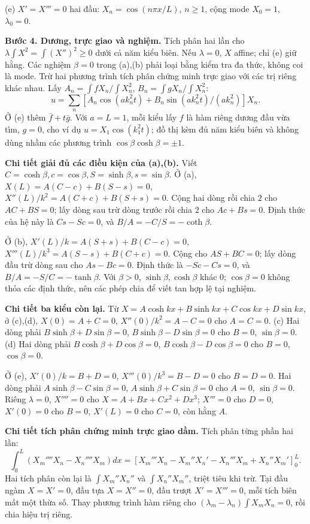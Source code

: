 \documentclass[10pt,a4paper]{article}
\begin{document}
(e) $X'=X'''=0$ hai đầu: $X_n=\cos(n\pi x/L)$, $n\ge1$, cộng mode $X_0=1$, $\lambda_0=0$.

\textbf{Bước 4. Dương, trực giao và nghiệm.} Tích phân hai lần cho $\lambda\int X^2=\int(X'')^2\ge0$ dưới cả năm kiểu biên. Nếu $\lambda=0$, $X$ affine; chỉ (e) giữ hằng. Các nghiệm $\beta=0$ trong (a),(b) phải loại bằng kiểm tra đa thức, không coi là mode. Trừ hai phương trình tích phân chứng minh trực giao với các trị riêng khác nhau. Lấy $A_n=\int fX_n/\int X_n^2$, $B_n=\int gX_n/\int X_n^2$:
\[u=\sum_n[A_n\cos(ak_n^2t)+B_n\sin(ak_n^2t)/(ak_n^2)]X_n.\]
Ở (e) thêm $\bar f+t\bar g$. Với $a=L=1$, mỗi kiểu lấy $f$ là hàm riêng dương đầu vừa tìm, $g=0$, cho ví dụ $u=X_1\cos(k_1^2t)$; đồ thị kèm đủ năm kiểu biên và không dùng nhầm các phương trình $\cos\beta\cosh\beta=\pm1$.

\textbf{Chi tiết giải đủ các điều kiện của (a),(b).} Viết $C=\cosh\beta,c=\cos\beta,S=\sinh\beta,s=\sin\beta$.
Ở (a), $X(L)=A(C-c)+B(S-s)=0$, $X''(L)/k^2=A(C+c)+B(S+s)=0$. Cộng hai dòng rồi chia $2$ cho $AC+BS=0$; lấy dòng sau trừ dòng trước rồi chia $2$ cho $Ac+Bs=0$. Định thức của hệ này là $Cs-Sc=0$, và $B/A=-C/S=-\coth\beta$.

Ở (b), $X'(L)/k=A(S+s)+B(C-c)=0$, $X'''(L)/k^3=A(S-s)+B(C+c)=0$. Cộng cho $AS+BC=0$; lấy dòng đầu trừ dòng sau cho $As-Bc=0$. Định thức là $-Sc-Cs=0$, và $B/A=-S/C=-\tanh\beta$. Với $\beta>0$, $\sinh\beta,\cosh\beta$ khác $0$; $\cos\beta=0$ không thỏa các định thức, nên các phép chia để viết tan hợp lệ tại nghiệm.

\textbf{Chi tiết ba kiểu còn lại.} Từ $X=A\cosh kx+B\sinh kx+C\cos kx+D\sin kx$, ở (c),(d), $X(0)=A+C=0$, $X''(0)/k^2=A-C=0$ cho $A=C=0$. (c) Hai dòng phải $B\sinh\beta+D\sin\beta=0$, $B\sinh\beta-D\sin\beta=0$ cho $B=0$, $\sin\beta=0$. (d) Hai dòng phải $B\cosh\beta+D\cos\beta=0$, $B\cosh\beta-D\cos\beta=0$ cho $B=0$, $\cos\beta=0$.

Ở (e), $X'(0)/k=B+D=0$, $X'''(0)/k^3=B-D=0$ cho $B=D=0$. Hai dòng phải $A\sinh\beta-C\sin\beta=0$, $A\sinh\beta+C\sin\beta=0$ cho $A=0$, $\sin\beta=0$. Riêng $\lambda=0$, $X''''=0$ cho $X=A+Bx+Cx^2+Dx^3$; $X'''=0$ cho $D=0$, $X'(0)=0$ cho $B=0$, $X'(L)=0$ cho $C=0$, còn hằng $A$.

\textbf{Chi tiết tích phân chứng minh trực giao dầm.} Tích phân từng phần hai lần:
\[\int_0^L(X_m''''X_n-X_n''''X_m)dx=
[X_m'''X_n-X_m''X_n'-X_n'''X_m+X_n''X_m']_0^L.\]
Hai tích phân còn lại là $\int X_m''X_n''$ và $\int X_n''X_m''$, triệt tiêu khi trừ. Tại đầu ngàm $X=X'=0$, đầu tựa $X=X''=0$, đầu trượt $X'=X'''=0$, mỗi tích biên mất một thừa số. Thay phương trình hàm riêng cho $(\lambda_m-\lambda_n)\int X_mX_n=0$, rồi chia hiệu trị riêng.
\end{document}
